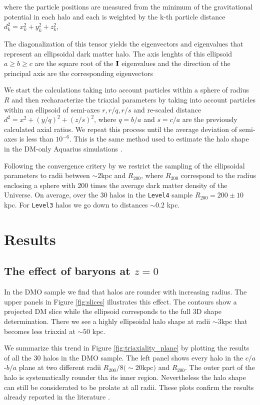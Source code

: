 \documentclass[a4paper,fleqn,usenatbib]{mnras}
\begin{document}
where the particle positions are measured from the minimum of the
gravitational potential in each halo and each is weighted by the k-th
particle distance 
$d_k^2=x_k^2+y_k^2+z_k^2$, 

The diagonalization of this tensor yields the eigenvectors and
eigenvalues that represent an ellipsoidal dark matter halo.
The axis lenghts of this ellipsoid $a\geq b \geq c$ are the square
root of the ${\bf I}$ eigenvalues and the direction of the principal
axis are the corresponding eigenvectors 

We start the calculations taking into account particles within a
sphere of radius $R$ and then recharacterize the triaxial parameters
by taking into account particles within an ellipsoid of semi-axes
$r,r/q,r/s$ and re-scaled distance $d^2=x^2+(y/q)^2+(z/s)^2$, where $q
= b/a$ and $s=c/a$ are the previously calculated axial ratios. 
We repeat this process until the average deviation of semi-axes is
less than $10^{-6}$.  
This is the same method used to estimate the halo shape in the DM-only
Aquarius simulations \citep{Vera-Ciro_et_al._2011}. 

Following the convergence critery by \cite{Vera-Crito_et_al.2011} we
restrict the sampling of the ellipsoidal parameters to radii  between
$\sim 2$kpc and $R_{200}$, where  $R_{200}$ correspond to the  radius
enclosing a sphere with 200 times the average dark matter density of
the Universe.  
On average, over the 30 halos in the \texttt{Level4} sample
$R_{200}=200\pm 10$kpc. 
For \texttt{Level3} halos we go down to distances $\sim 0.2$ kpc.  


\section{Results}

\subsection{The effect of baryons at $z=0$}

In the DMO sample we find that halos are rounder with increasing
radius.
The upper panels in Figure \ref{fig:slices} illustrates this effect.
The contours show a projected DM slice while the ellipsoid corresponds
to the full 3D shape determination. 
There we see a highly ellipsoidal halo shape at radii $\sim 3$kpc
that becomes less triaxial at $\sim 50$ kpc.


We summarize this trend in Figure \ref{fig:triaxiality_plane} by
plotting the results of all the 30 halos in the DMO sample.
The left panel shows every halo in the $c/a$-$b/a$ plane at
two different radii $R_{200}/8 (\sim 20$kpc$)$ and $R_{200}$. 
The outer part of the halo is systematically rounder tha its inner
region. 
Nevertheless the halo shape can still be considerated to be prolate at
all radii. 
These plots confirm the results already reported in the
literature \citep{Vera-Ciro_et_al._2011}.
\end{document}
